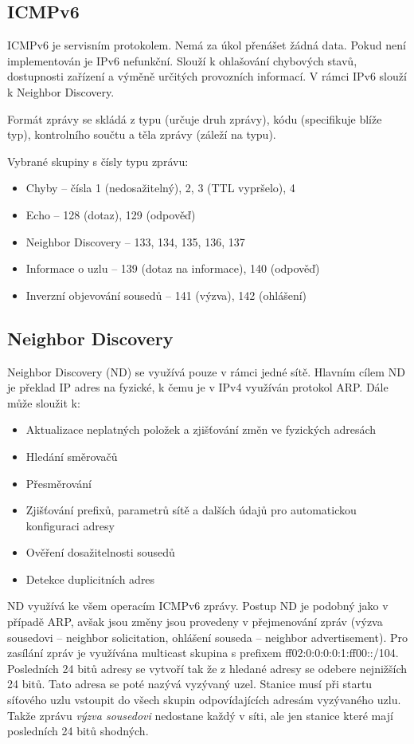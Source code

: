 \subsection{ICMPv6}

ICMPv6 je servisním protokolem.
Nemá za úkol přenášet žádná data.
Pokud není implementován je IPv6 nefunkční.
Slouží k ohlašování chybových stavů, dostupnosti zařízení a výměně určitých provozních informací.
V rámci IPv6 slouží k Neighbor Discovery.

Formát zprávy se skládá z typu (určuje druh zprávy), kódu (specifikuje blíže typ), kontrolního součtu a těla zprávy (záleží na typu).

Vybrané skupiny s čísly typu zprávu:
\begin{itemize}[noitemsep]
    \item Chyby -- čísla 1 (nedosažitelný), 2, 3 (TTL vypršelo), 4
    \item Echo -- 128 (dotaz), 129 (odpověď)
    \item Neighbor Discovery -- 133, 134, 135, 136, 137
    \item Informace o uzlu -- 139 (dotaz na informace), 140 (odpověď)
    \item Inverzní objevování sousedů -- 141 (výzva), 142 (ohlášení)
\end{itemize}

\subsection{Neighbor Discovery}

Neighbor Discovery (ND) se využívá pouze v rámci jedné sítě.
Hlavním cílem ND je překlad IP adres na fyzické, k čemu je v IPv4 využíván protokol ARP.
Dále může sloužit k:
\begin{itemize}[noitemsep]
    \item Aktualizace neplatných položek a zjišťování změn ve fyzických adresách
    \item Hledání směrovačů
    \item Přesměrování
    \item Zjišťování prefixů, parametrů sítě a dalších údajů pro automatickou konfiguraci adresy
    \item Ověření dosažitelnosti sousedů
    \item Detekce duplicitních adres
\end{itemize}

ND využívá ke všem operacím ICMPv6 zprávy.
Postup ND je podobný jako v případě ARP, avšak jsou změny jsou provedeny v přejmenování zpráv (výzva sousedovi -- neighbor solicitation, ohlášení souseda -- neighbor advertisement).
Pro zasílání zpráv je využívána multicast skupina s prefixem ff02:0:0:0:0:1:ff00::/104.
Posledních 24 bitů adresy se vytvoří tak že z hledané adresy se odebere nejnižších 24 bitů.
Tato adresa se poté nazývá vyzývaný uzel.
Stanice musí při startu síťového uzlu vstoupit do všech skupin odpovídajících adresám vyzývaného uzlu.
Takže zprávu \textit{výzva sousedovi} nedostane každý v síti, ale jen stanice které mají posledních 24 bitů shodných.

